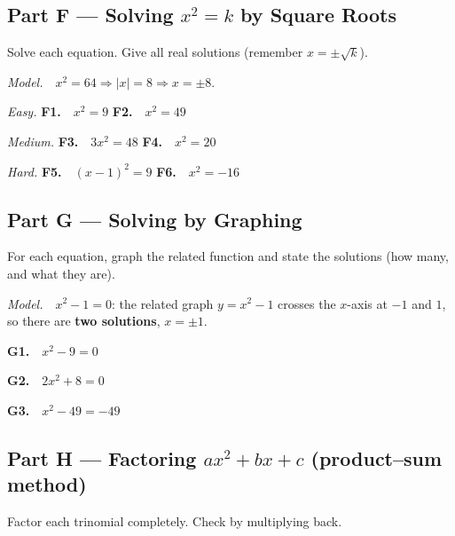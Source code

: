 \documentclass[11pt]{article}
\begin{document}
\subsection*{Part F --- Solving $x^2 = k$ by Square Roots}

Solve each equation. Give all real solutions (remember $x = \pm\sqrt{k}$).

\textit{Model.}\ \ $x^2 = 64 \Rightarrow |x| = 8 \Rightarrow x = \pm 8$.

\vspace{6pt}
\textit{Easy.}\quad
\textbf{F1.}\ \ $x^2 = 9$ \hspace{3cm} \textbf{F2.}\ \ $x^2 = 49$
\vspace{1.4cm}

\textit{Medium.}\quad
\textbf{F3.}\ \ $3x^2 = 48$ \hspace{2.4cm} \textbf{F4.}\ \ $x^2 = 20$
\vspace{1.4cm}

\textit{Hard.}\quad
\textbf{F5.}\ \ $(x-1)^2 = 9$ \hspace{2.2cm} \textbf{F6.}\ \ $x^2 = -16$
\vspace{1.6cm}

\subsection*{Part G --- Solving by Graphing}

For each equation, graph the related function and state the solutions (how many, and what
they are).

\textit{Model.}\ \ $x^2 - 1 = 0$: the related graph $y = x^2 - 1$ crosses the $x$-axis at $-1$
and $1$, so there are \textbf{two solutions}, $x = \pm 1$.

\vspace{6pt}
\textbf{G1.}\ \ $x^2 - 9 = 0$
\vspace{1.4cm}

\textbf{G2.}\ \ $2x^2 + 8 = 0$
\vspace{1.4cm}

\textbf{G3.}\ \ $x^2 - 49 = -49$
\vspace{1.6cm}

\subsection*{Part H --- Factoring $ax^2 + bx + c$ (product--sum method)}

Factor each trinomial completely. Check by multiplying back.
\end{document}
